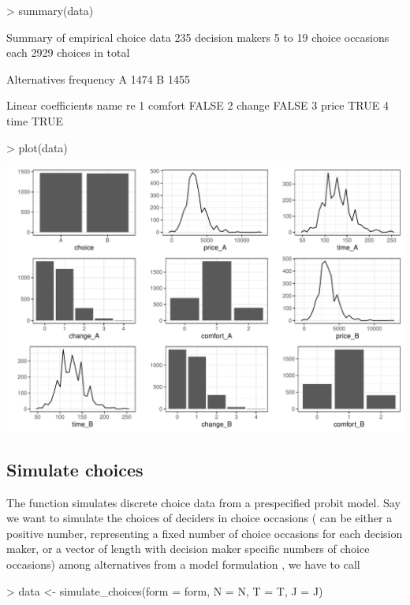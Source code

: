 \documentclass[article]{jss}
\newcommand{\fct}[1]{\code{#1()}}
\begin{document}
\begin{Schunk}
\begin{Sinput}
> summary(data)
\end{Sinput}
\begin{Soutput}
Summary of empirical choice data
235 decision makers 
5 to 19 choice occasions each 
2929 choices in total

Alternatives
  frequency
A      1474
B      1455

Linear coefficients
     name    re
1 comfort FALSE
2  change FALSE
3   price  TRUE
4    time  TRUE
\end{Soutput}
\begin{Sinput}
> plot(data)
\end{Sinput}
\end{Schunk}
\includegraphics{rprobitb_oelschlaeger_bauer-summary-plot-Train-data}

\subsection{Simulate choices} \label{subsec:simulate_choices}

The \fct{simulate\_choices} function simulates discrete choice data from a prespecified probit model. Say we want to simulate the choices of  deciders in  choice occasions ( can be either a positive number, representing a fixed number of choice occasions for each decision maker, or a vector of length  with decision maker specific numbers of choice occasions) among  alternatives from a model formulation , we have to call

\begin{Schunk}
\begin{Sinput}
> data <- simulate_choices(form = form, N = N, T = T, J = J)
\end{Sinput}
\end{Schunk}
\end{document}
